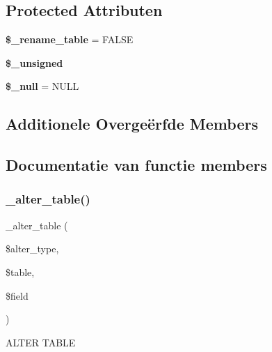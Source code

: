\subsection*{Protected Attributen}
\begin{DoxyCompactItemize}
\item 
\mbox{\label{class_c_i___d_b__pdo__firebird__forge_a1a649e7cf9de16bcf932977b18bc91de}} 
{\bfseries \$\+\_\+rename\+\_\+table} = F\+A\+L\+SE
\item 
{\bfseries \$\+\_\+unsigned}
\item 
\mbox{\label{class_c_i___d_b__pdo__firebird__forge_ae58fe6a5104d4a069a49b27533ce808f}} 
{\bfseries \$\+\_\+null} = \textquotesingle{}N\+U\+LL\textquotesingle{}
\end{DoxyCompactItemize}
\subsection*{Additionele Overge\"{e}rfde Members}


\subsection{Documentatie van functie members}
\mbox{\label{class_c_i___d_b__pdo__firebird__forge_a41c6cae02f2fda8b429ad0afb9509426}} 
\subsubsection{\texorpdfstring{\_alter\_table()}{\_alter\_table()}}
{\footnotesize\ttfamily \+\_\+alter\+\_\+table (\begin{DoxyParamCaption}\item[{}]{\$alter\+\_\+type,  }\item[{}]{\$table,  }\item[{}]{\$field }\end{DoxyParamCaption})\hspace{0.3cm}{\ttfamily [protected]}}

A\+L\+T\+ER T\+A\+B\+LE


